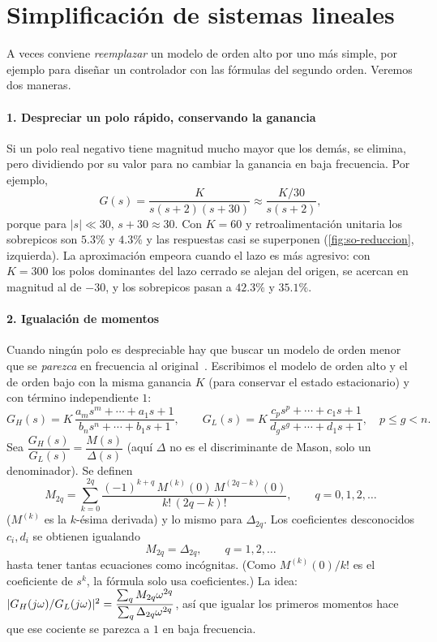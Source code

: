 \section{Simplificación de sistemas lineales}
\label{sec:so-reduccion}

A veces conviene \emph{reemplazar} un modelo de orden alto por uno más simple, por ejemplo para diseñar un controlador con las fórmulas del segundo orden. Veremos dos maneras.

\paragraph{1. Despreciar un polo rápido, conservando la ganancia} Si un polo real negativo tiene magnitud mucho mayor que los demás, se elimina, pero dividiendo por su valor para no cambiar la ganancia en baja frecuencia. Por ejemplo,
\[
  G(s)=\frac{K}{s(s+2)(s+30)}\approx\frac{K/30}{s(s+2)},
\]
porque para $|s|\ll30$, $s+30\approx30$. Con $K=60$ y retroalimentación unitaria los sobrepicos son $5.3\%$ y $4.3\%$ y las respuestas casi se superponen (\cref{fig:so-reduccion}, izquierda). La aproximación empeora cuando el lazo es más agresivo: con $K=300$ los polos dominantes del lazo cerrado se alejan del origen, se acercan en magnitud al de $-30$, y los sobrepicos pasan a $42.3\%$ y $35.1\%$.


\paragraph{2. Igualación de momentos} Cuando ningún polo es despreciable hay que buscar un modelo de orden menor que se \emph{parezca} en frecuencia al original~\citep{DoBi08}. Escribimos el modelo de orden alto y el de orden bajo con la misma ganancia $K$ (para conservar el estado estacionario) y con término independiente $1$:
\[
  G_H(s)=K\,\frac{a_ms^m+\cdots+a_1s+1}{b_ns^n+\cdots+b_1s+1},\qquad
  G_L(s)=K\,\frac{c_ps^p+\cdots+c_1s+1}{d_gs^g+\cdots+d_1s+1},\quad p\leq g<n.
\]
Sea $\dfrac{G_H(s)}{G_L(s)}=\dfrac{M(s)}{\Delta(s)}$ (aquí $\Delta$ no es el discriminante de Mason, solo un denominador). Se definen
\begin{equation}
  M_{2q}=\sum_{k=0}^{2q}\frac{(-1)^{k+q}\,M^{(k)}(0)\,M^{(2q-k)}(0)}{k!\,(2q-k)!},\qquad q=0,1,2,\dots
  \label{eq:so-momentos}
\end{equation}
($M^{(k)}$ es la $k$-ésima derivada) y lo mismo para $\Delta_{2q}$. Los coeficientes desconocidos $c_i,d_i$ se obtienen igualando
\[
  M_{2q}=\Delta_{2q},\qquad q=1,2,\dots
\]
hasta tener tantas ecuaciones como incógnitas. (Como $M^{(k)}(0)/k!$ es el coeficiente de $s^k$, la fórmula solo usa coeficientes.) La idea: $|G_H(j\omega)/G_L(j\omega)|^2=\dfrac{\sum_q M_{2q}\omega^{2q}}{\sum_q\Delta_{2q}\omega^{2q}}$, así que igualar los primeros momentos hace que ese cociente se parezca a $1$ en baja frecuencia.


